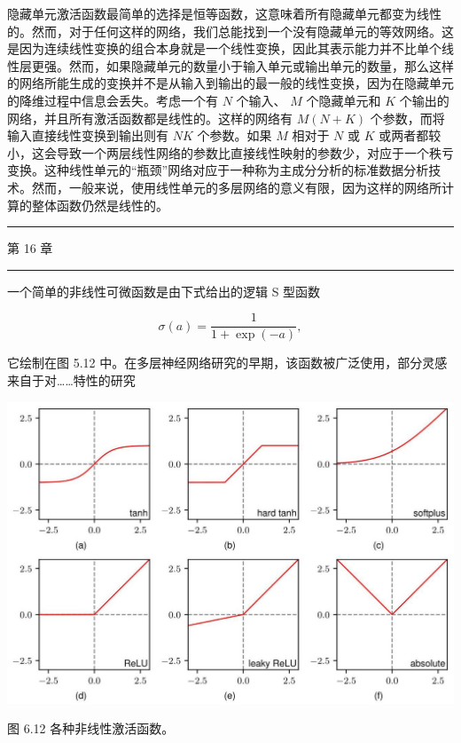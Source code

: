 \documentclass[10pt]{article}
\newcommand{\HRule}{\begin{center}\rule{0.9\linewidth}{0.2mm}\end{center}}
\begin{document}
隐藏单元激活函数最简单的选择是恒等函数，这意味着所有隐藏单元都变为线性的。然而，对于任何这样的网络，我们总能找到一个没有隐藏单元的等效网络。这是因为连续线性变换的组合本身就是一个线性变换，因此其表示能力并不比单个线性层更强。然而，如果隐藏单元的数量小于输入单元或输出单元的数量，那么这样的网络所能生成的变换并不是从输入到输出的最一般的线性变换，因为在隐藏单元的降维过程中信息会丢失。考虑一个有 \(N\) 个输入、 \(M\) 个隐藏单元和 \(K\) 个输出的网络，并且所有激活函数都是线性的。这样的网络有 \(M\left( {N + K}\right)\) 个参数，而将输入直接线性变换到输出则有 \({NK}\) 个参数。如果 \(M\) 相对于 \(N\) 或 \(K\) 或两者都较小，这会导致一个两层线性网络的参数比直接线性映射的参数少，对应于一个秩亏变换。这种线性单元的“瓶颈”网络对应于一种称为主成分分析的标准数据分析技术。然而，一般来说，使用线性单元的多层网络的意义有限，因为这样的网络所计算的整体函数仍然是线性的。

\HRule

第 16 章

\HRule

一个简单的非线性可微函数是由下式给出的逻辑 S 型函数

\[
\sigma \left( a\right)  = \frac{1}{1 + \exp \left( {-a}\right) }, \tag{6.13}
\]

它绘制在图 5.12 中。在多层神经网络研究的早期，该函数被广泛使用，部分灵感来自于对……特性的研究

\begin{center}
\includegraphics[max width=1.0\textwidth]{images/0194e279-9b28-703a-88f4-c3ac21e2010d_203_243_340_1303_880_0.jpg}
\end{center}
\hspace*{3em} 

图 6.12 各种非线性激活函数。
\end{document}
